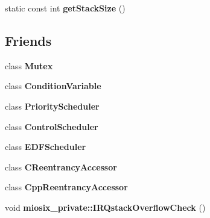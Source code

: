 \begin{DoxyCompactItemize}
\item 
\hypertarget{classmiosix_1_1_thread_a645f06c3aacd91de8a620f9520b28a19}{static const int {\bfseries get\-Stack\-Size} ()}\label{classmiosix_1_1_thread_a645f06c3aacd91de8a620f9520b28a19}

\end{DoxyCompactItemize}
\subsection*{Friends}
\begin{DoxyCompactItemize}
\item 
\hypertarget{classmiosix_1_1_thread_a0299a51a8b97fb3200509d92ba10fa2c}{class {\bfseries Mutex}}\label{classmiosix_1_1_thread_a0299a51a8b97fb3200509d92ba10fa2c}

\item 
\hypertarget{classmiosix_1_1_thread_ab270e49e575fdf0fe1a4f2ee911df116}{class {\bfseries Condition\-Variable}}\label{classmiosix_1_1_thread_ab270e49e575fdf0fe1a4f2ee911df116}

\item 
\hypertarget{classmiosix_1_1_thread_af22ee38d5c5f8f0e8f6a4b4ac10f74e6}{class {\bfseries Priority\-Scheduler}}\label{classmiosix_1_1_thread_af22ee38d5c5f8f0e8f6a4b4ac10f74e6}

\item 
\hypertarget{classmiosix_1_1_thread_af59484a761a3671aa7a7955169aecd70}{class {\bfseries Control\-Scheduler}}\label{classmiosix_1_1_thread_af59484a761a3671aa7a7955169aecd70}

\item 
\hypertarget{classmiosix_1_1_thread_a71ebf1420d5ff18bb785abe0a8b247ac}{class {\bfseries E\-D\-F\-Scheduler}}\label{classmiosix_1_1_thread_a71ebf1420d5ff18bb785abe0a8b247ac}

\item 
\hypertarget{classmiosix_1_1_thread_a50d12034b3fec16c639239e059894524}{class {\bfseries C\-Reentrancy\-Accessor}}\label{classmiosix_1_1_thread_a50d12034b3fec16c639239e059894524}

\item 
\hypertarget{classmiosix_1_1_thread_abec53b1d1198012c3c7d28ba495f8b8c}{class {\bfseries Cpp\-Reentrancy\-Accessor}}\label{classmiosix_1_1_thread_abec53b1d1198012c3c7d28ba495f8b8c}

\item 
\hypertarget{classmiosix_1_1_thread_ada350af94668c645cfe2f52d172da513}{void {\bfseries miosix\-\_\-private\-::\-I\-R\-Qstack\-Overflow\-Check} ()}\label{classmiosix_1_1_thread_ada350af94668c645cfe2f52d172da513}


\end{DoxyCompactItemize}
